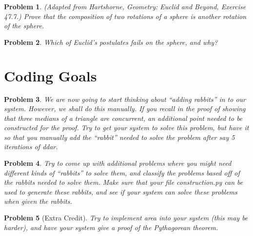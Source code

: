 \documentclass{article}
\newtheorem{problem}{Problem}
\begin{document}
\begin{problem}
    (Adapted from Hartshorne, \emph{Geometry: Euclid and Beyond},
    Exercise 47.7.) Prove that the composition of two rotations of a sphere is
    another rotation of the sphere.
\end{problem}

\begin{problem}
    Which of Euclid's postulates fails on the sphere, and why?
\end{problem}

\newpage

\section{Coding Goals}

\begin{problem}
    We are now going to start thinking about ``adding rabbits'' in to our system. However, we shall do this manually. If you recall in the proof of showing that three medians of a triangle are concurrent, an additional point needed to be constructed for the proof. Try to get your system to solve this problem, but have it so that you manually add the ``rabbit'' needed to solve the problem after say 5 iterations of ddar. 
\end{problem}

\begin{problem}
    Try to come up with additional problems where you might need different kinds of ``rabbits'' to solve them, and classify the problems based off of the rabbits needed to solve them. Make sure that your file construction.py can be used to generate these rabbits, and see if your system can solve these problems when given the rabbits. 
\end{problem}

\begin{problem}[Extra Credit]
    Try to implement area into your system (this may be harder), and have your system give a proof of the Pythagorean theorem. 
\end{problem}
\end{document}
